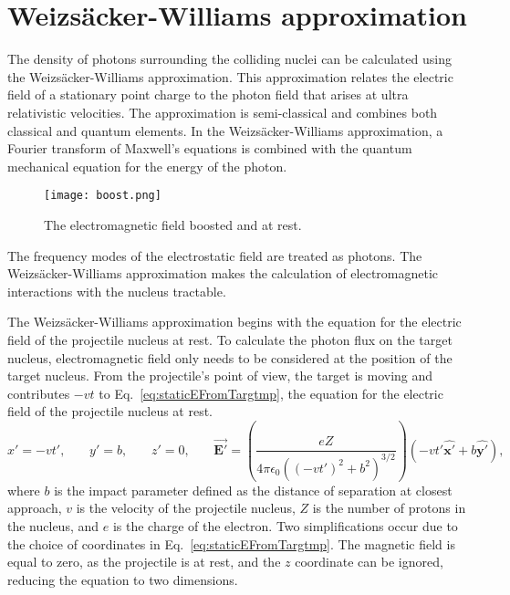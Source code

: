   \section{Weizs\"{a}cker-Williams approximation \label{sec:wwAprox}}
    The density of photons surrounding the colliding nuclei can be calculated 
      using the Weizs\"{a}cker-Williams approximation. 
    This approximation relates the electric field of a stationary point charge 
      to the photon field that arises at ultra relativistic velocities. 
    The approximation is semi-classical and combines both classical and quantum 
      elements.
    In the Weizs\"{a}cker-Williams 
      approximation, a Fourier transform of Maxwell's equations is combined 
      with the quantum mechanical equation for the energy of the photon.   
    \begin{figure}[!Hhbt]
      \begin{center}
        \texttt{[image: boost.png]}
      \end{center}
      \caption{ \label{fig:boost} The electromagnetic field boosted and at rest. }
    \end{figure}
    The frequency modes of the electrostatic field are treated as photons. 
    The Weizs\"{a}cker-Williams approximation makes the calculation of 
      electromagnetic interactions with the nucleus tractable. 

    The Weizs\"{a}cker-Williams approximation begins with the equation for the 
      electric field of the projectile nucleus at rest. 
    To calculate the photon flux on the target nucleus, electromagnetic field 
      only needs to be considered at the position of the target nucleus. 
    From the projectile's point of view, the target is moving and contributes
     $-vt$ to Eq.~\ref{eq:staticEFromTargtmp}, the equation for the electric 
     field of the projectile nucleus at rest.
    \begin{equation} \label{eq:staticEFromTargtmp}
        x'=-vt'\textrm{,}\qquad
        y'=b\textrm{,}\qquad
        z'=0\textrm{,}\qquad
        \vec{\mathbf{E'}}=\left(\frac{eZ}
         {4 \pi \epsilon_{0}\left(\left(-vt'\right)^{2}+b^{2}\right)^{3/2}}\right)
         \left(-vt'{\mathbf{\hat{x'}}+b\mathbf{\hat{y'}}}\right)\textrm{,}
    \end{equation}        
      where $b$ is the impact parameter
      defined as the distance of separation at closest approach, $v$ is the velocity of the 
      projectile nucleus, $Z$ is the number of protons in the nucleus, and $e$ 
      is the charge of the electron.
    Two simplifications occur due to the choice of coordinates in 
      Eq.~\ref{eq:staticEFromTargtmp}.
    The magnetic field is equal to zero, as the projectile is at rest, and
      the $z$ coordinate can be ignored, reducing the equation to two dimensions. 

